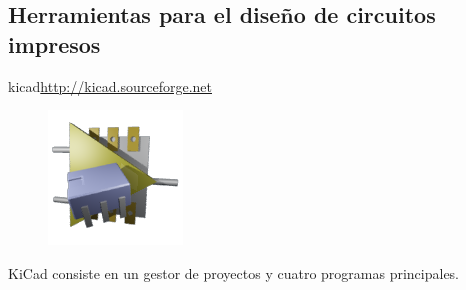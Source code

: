\documentclass{beamer}
\begin{document}
\subsection[PCB]{Herramientas para el diseño de circuitos impresos}

\begin{frame}{kicad}{\url{http://kicad.sourceforge.net}}
  \begin{figure}[!h]
    \centering
    \includegraphics[scale=0.5]{img/kicad.png}
  \end{figure}
  KiCad consiste en un gestor de proyectos y cuatro programas principales.
\end{frame}




\end{document}
